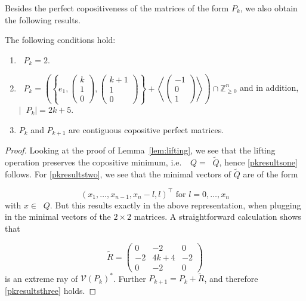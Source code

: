 \documentclass{commat}
\newcommand{\IZ}{{\mathbb{Z}}}
\newcommand{\IZngeo}{\IZ_{\geq0}^n}
\newcommand{\cop}{{\mathcal{COP}}}
\DeclareMathOperator{\minC}{min_{\cop}}
\DeclareMathOperator{\MinC}{Min_{\cop}}
\begin{document}
Besides the perfect copositiveness of the matrices of the form \(P_k \), we also obtain the following results.
\begin{corollary}\label{cor:pkresults}
	The following conditions hold:
\begin{enumerate}
		\item\label{pkresultsone} \(\minC P_k=2 \).
		\item\label{pkresultstwo} \(\MinC P_k=
                \left(\left\{ e_1,
\begin{pmatrix}
k \\ 1 \\ 0
\end{pmatrix}
,
\begin{pmatrix}
k + 1 \\ 1 \\ 0
\end{pmatrix}
\right\}+
                 \left\langle
\begin{pmatrix}
-1 \\ 0 \\ 1
\end{pmatrix}
\right\rangle\right)\cap\IZngeo
               \)
               and in addition, \\ \(\left\vert \MinC P_k \right\vert=2k+5 \).
		\item\label{pkresultsthree} \(P_k \) and \(P_{k+1} \) are contiguous copositive perfect matrices.
	
\end{enumerate}
\end{corollary}
\begin{proof}
	Looking at the proof of Lemma~\ref{lem:lifting}, we see that the lifting operation preserves
	the copositive minimum, i.e.\ \(\minC Q = \minC\widetilde{Q} \), hence \eqref{pkresultsone} follows.
	For \eqref{pkresultstwo}, we see that the minimal vectors of \(\widetilde{Q} \) are of the form
	
\[
		{(x_1, \dots, x_{n-1}, x_n-l, l)}^\intercal \text{ for } l=0,\dots,x_n
\]
	with \(x\in\MinC Q \).
	But this results exactly in the above representation, when plugging in the minimal vectors
	of the \(2\times2 \) matrices.
	A straightforward calculation shows that
	
\[
		\widetilde{R}=
\begin{pmatrix}
0 & -2 & 0 \\ -2 & 4k+4 & -2 \\ 0 & -2 & 0
\end{pmatrix}
\]
	is an extreme ray of \({\mathcal{V}(P_k)}^* \).
	Further \(P_{k+1} = P_k + \widetilde{R} \), and therefore \eqref{pkresultsthree} holds.
\end{proof}
\end{document}
